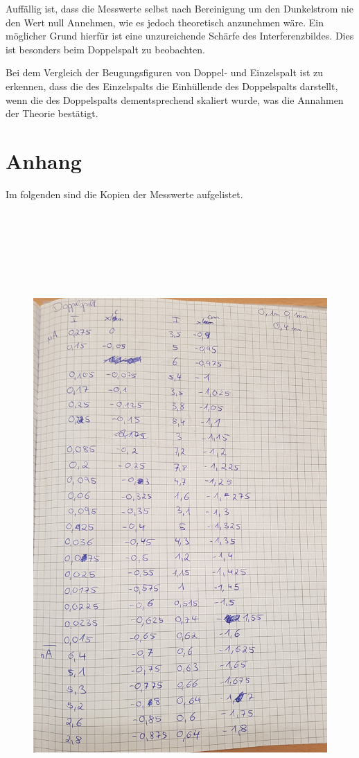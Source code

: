 Auffällig ist, dass die Messwerte selbst nach Bereinigung um den Dunkelstrom nie
den Wert null Annehmen, wie es jedoch theoretisch anzunehmen wäre. Ein möglicher Grund
hierfür ist eine unzureichende Schärfe des Interferenzbildes. Dies ist besonders beim
Doppelspalt zu beobachten.

Bei dem Vergleich der Beugungsfiguren von Doppel- und Einzelspalt ist zu
erkennen, dass die des Einzelspalts die Einhüllende des Doppelspalts darstellt, wenn die
des Doppelspalts dementsprechend skaliert wurde, was die Annahmen der Theorie bestätigt.


\section{Anhang}
\label{sec:Anhang}
Im folgenden sind die Kopien der Messwerte aufgelistet.
\begin{figure}[H]
  \centering
  \includegraphics[height=24cm]{1 (5).jpg}
\end{figure}
